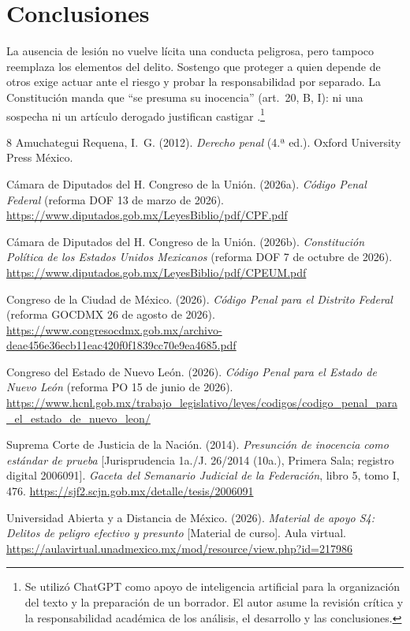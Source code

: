 \documentclass[spanish,letterpaper,oneside]{article}
\begin{document}
\clearpage
\section{Conclusiones}
La ausencia de lesión no vuelve lícita una conducta peligrosa, pero tampoco reemplaza los elementos del delito. Sostengo que proteger a quien depende de otros exige actuar ante el riesgo y probar la responsabilidad por separado. La Constitución manda que ``se presuma su inocencia'' (art.~20, B, I): ni una sospecha ni un artículo derogado justifican castigar \citep{cpeumS4Vigente}.\footnote{Se utilizó ChatGPT como apoyo de inteligencia artificial para la organización del texto y la preparación de un borrador. El autor asume la revisión crítica y la responsabilidad académica de los análisis, el desarrollo y las conclusiones.}
\hypertarget{cuerpo-fin}{}

\clearpage
\begingroup\fontsize{10}{11.5}\selectfont
\setlength{\bibsep}{4pt}
\begin{thebibliography}{8}
Amuchategui Requena, I.~G. (2012). \emph{Derecho penal} (4.ª ed.). Oxford University Press México.

Cámara de Diputados del H. Congreso de la Unión. (2026a). \emph{Código Penal Federal} (reforma DOF 13 de marzo de 2026). \url{https://www.diputados.gob.mx/LeyesBiblio/pdf/CPF.pdf}

Cámara de Diputados del H. Congreso de la Unión. (2026b). \emph{Constitución Política de los Estados Unidos Mexicanos} (reforma DOF 7 de octubre de 2026). \url{https://www.diputados.gob.mx/LeyesBiblio/pdf/CPEUM.pdf}

Congreso de la Ciudad de México. (2026). \emph{Código Penal para el Distrito Federal} (reforma GOCDMX 26 de agosto de 2026). \url{https://www.congresocdmx.gob.mx/archivo-deae456e36ecb11eac420f0f1839cc70e9ea4685.pdf}

Congreso del Estado de Nuevo León. (2026). \emph{Código Penal para el Estado de Nuevo León} (reforma PO 15 de junio de 2026). \url{https://www.hcnl.gob.mx/trabajo_legislativo/leyes/codigos/codigo_penal_para_el_estado_de_nuevo_leon/}

Suprema Corte de Justicia de la Nación. (2014). \emph{Presunción de inocencia como estándar de prueba} [Jurisprudencia 1a./J. 26/2014 (10a.), Primera Sala; registro digital 2006091]. \emph{Gaceta del Semanario Judicial de la Federación}, libro 5, tomo I, 476. \url{https://sjf2.scjn.gob.mx/detalle/tesis/2006091}

Universidad Abierta y a Distancia de México. (2026). \emph{Material de apoyo S4: Delitos de peligro efectivo y presunto} [Material de curso]. Aula virtual. \url{https://aulavirtual.unadmexico.mx/mod/resource/view.php?id=217986}
\end{thebibliography}
\endgroup
\end{document}
